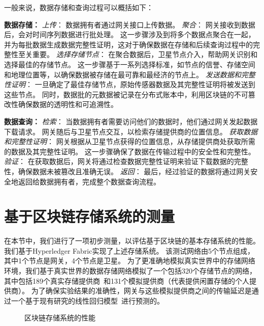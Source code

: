 一般来说，数据存储和查询过程可以概括如下：

\textbf{数据存储：}
\textit{上传}：
数据拥有者通过网关接口上传数据。
\textit{聚合}：
网关接收到数据后，会对时间序列数据进行批处理。
这一步骤涉及到将多个数据点聚合在一起，并为每批数据生成数据完整性证明，这对于确保数据在存储和后续查询过程中的完整性至关重要。
\textit{选择存储节点}：
在聚合数据后，卫星节点介入，帮助网关识别和选择最佳的存储节点。
这一步骤基于一系列选择标准，如节点的信誉、存储空间和地理位置等，以确保数据被存储在最可靠和最经济的节点上。
\textit{发送数据和完整性证明}：
一旦确定了最佳存储节点，原始传感器数据及其完整性证明将被发送到这些节点。
同时，数据批的元数据被记录在分布式账本中，利用区块链的不可篡改性确保数据的透明性和可追溯性。

\textbf{数据查询：}
\textit{检索}：
当数据拥有者需要访问他们的数据时，他们通过网关发起数据下载请求。
网关随后与卫星节点交互，以检索存储提供商的位置信息。
\textit{获取数据和完整性证明}：
网关根据从卫星节点获得的位置信息，从存储提供商处获取所需的数据及其完整性证明。
这一步骤确保了数据在传输过程中的安全性和完整性。
\textit{验证}：
在获取数据后，网关将通过检查数据完整性证明来验证下载数据的完整性，确保数据未被篡改且准确无误。
\textit{返回}：
最后，经过验证的数据将通过网关安全地返回给数据拥有者，完成整个数据查询流程。

\section{基于区块链存储系统的测量}
在本节中，我们进行了一项初步测量，以评估基于区块链的基本存储系统的性能。
我们基于Hyperledger Fabric实现了上述存储系统。
该测试网络由5个节点组成，其中1个节点是网关，4个节点是卫星。
为了更准确地模拟真实世界中的存储网络环境，我们基于真实世界的数据存储网络模拟了一个包括320个存储节点的网络，其中包括189个真实存储提供商~\cite{corneo2021surrounded}和131个模拟提供商（代表提供闲置存储的个人提供商）。
为了确保实验结果的准确性，网关与这些模拟提供商之间的传输延迟是通过一个基于现有研究的线性回归模型~\cite{ziviani2005improving}进行预测的。
\begin{figure*}[t]
    \centering
    \begin{minipage}{0.9\linewidth}
	    \centering
        \hfill
        \caption{区块链存储系统的性能} 
    \end{minipage}
\end{figure*}

